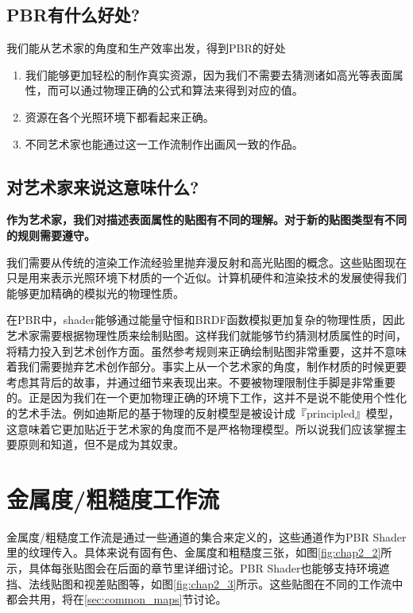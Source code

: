 \subsection{PBR有什么好处?}

我们能从艺术家的角度和生产效率出发，得到PBR的好处

\begin{enumerate}
\item 我们能够更加轻松的制作真实资源，因为我们不需要去猜测诸如高光等表面属性，而可以通过物理正确的公式和算法来得到对应的值。
\item 资源在各个光照环境下都看起来正确。
\item 不同艺术家也能通过这一工作流制作出画风一致的作品。
\end{enumerate}

\subsection{对艺术家来说这意味什么?}

\textbf{作为艺术家，我们对描述表面属性的贴图有不同的理解。对于新的贴图类型有不同的规则需要遵守。}

我们需要从传统的渲染工作流经验里抛弃漫反射和高光贴图的概念。这些贴图现在只是用来表示光照环境下材质的一个近似。计算机硬件和渲染技术的发展使得我们能够更加精确的模拟光的物理性质。

在PBR中，shader能够通过能量守恒和BRDF函数模拟更加复杂的物理性质，因此艺术家需要根据物理性质来绘制贴图。这样我们就能够节约猜测材质属性的时间，将精力投入到艺术创作方面。虽然参考规则来正确绘制贴图非常重要，这并不意味着我们需要抛弃艺术创作部分。事实上从一个艺术家的角度，制作材质的时候更要考虑其背后的故事，并通过细节来表现出来。不要被物理限制住手脚是非常重要的。正是因为我们在一个更加物理正确的环境下工作，这并不是说不能使用个性化的艺术手法。例如迪斯尼的基于物理的反射模型是被设计成『principled』模型，这意味着它更加贴近于艺术家的角度而不是严格物理模型。所以说我们应该掌握主要原则和知道，但不是成为其奴隶。

\section{金属度/粗糙度工作流}

金属度/粗糙度工作流是通过一些通道的集合来定义的，这些通道作为PBR Shader里的纹理传入。具体来说有固有色、金属度和粗糙度三张，如图\ref{fig:chap2_2}所示，具体每张贴图会在后面的章节里详细讨论。PBR Shader也能够支持环境遮挡、法线贴图和视差贴图等，如图\ref{fig:chap2_3}所示。这些贴图在不同的工作流中都会共用，将在\ref{sec:common_maps}节讨论。

